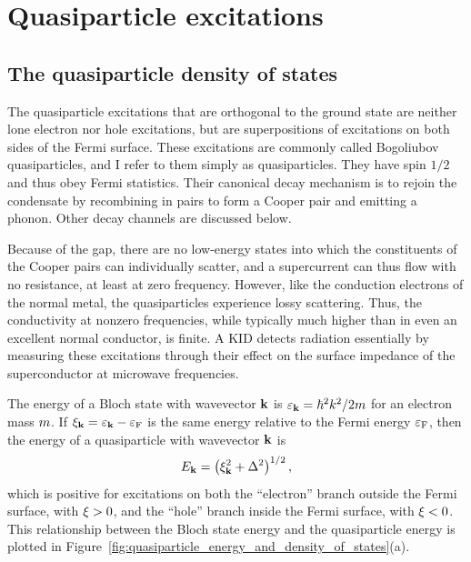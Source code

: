 \section{Quasiparticle excitations}
\label{sec:theory.quasiparticle}

\subsection{The quasiparticle density of states}
\label{sec:theory.quasiparticle.dos}

The quasiparticle excitations that are orthogonal to the ground state are neither lone electron nor hole excitations, but are superpositions of excitations on both sides of the Fermi surface.
These excitations are commonly called Bogoliubov quasiparticles, and I refer to them simply as quasiparticles.
They have spin $1 / 2$ and thus obey Fermi statistics.
Their canonical decay mechanism is to rejoin the condensate by recombining in pairs to form a Cooper pair and emitting a phonon.
Other decay channels are discussed below.

Because of the gap, there are no low-energy states into which the constituents of the Cooper pairs can individually scatter, and a supercurrent can thus flow with no resistance, at least at zero frequency.
However, like the conduction electrons of the normal metal, the quasiparticles experience lossy scattering.
Thus, the conductivity at nonzero frequencies, while typically much higher than in even an excellent normal conductor, is finite.
A KID detects radiation essentially by measuring these excitations through their effect on the surface impedance of the superconductor at microwave frequencies.

The energy of a Bloch state with wavevector $\vb{k}$ is
$\varepsilon_{\vb{k}} = \hbar^2 k^2 / 2 m$
for an electron mass $m$.
If $\xi_{\vb{k}} = \varepsilon_{\vb{k}} - \varepsilon_{\mathrm{F}}$ is the same energy relative to the Fermi energy $\varepsilon_{\mathrm{F}}$, then the energy of a quasiparticle with wavevector $\vb{k}$ is
\begin{equation}
E_{\vb{k}}
  =
  \left( \xi_{\vb{k}}^2 + \Delta^2 \right)^{1/2},
\label{eqn:qpenergy}
\end{equation}
which is positive for excitations on both the ``electron'' branch outside the Fermi surface, with $\xi > 0$, and the ``hole'' branch inside the Fermi surface, with $\xi < 0$.
This relationship between the Bloch state energy and the quasiparticle energy is plotted in Figure~\ref{fig:quasiparticle_energy_and_density_of_states}(a).

